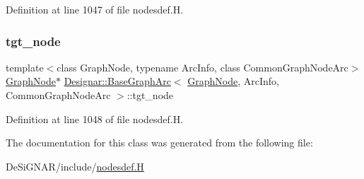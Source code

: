 Definition at line 1047 of file nodesdef.\+H.

\mbox{\label{class_designar_1_1_base_graph_arc_af09ee39743d9a2e6f7bad479d925c273}} 
\subsubsection{\texorpdfstring{tgt\+\_\+node}{tgt\_node}}
{\footnotesize\ttfamily template$<$class Graph\+Node, typename Arc\+Info, class Common\+Graph\+Node\+Arc$>$ \\
\hyperlink{class_designar_1_1_graph_node}{Graph\+Node}$\ast$ \hyperlink{class_designar_1_1_base_graph_arc}{Designar\+::\+Base\+Graph\+Arc}$<$ \hyperlink{class_designar_1_1_graph_node}{Graph\+Node}, Arc\+Info, Common\+Graph\+Node\+Arc $>$\+::tgt\+\_\+node\hspace{0.3cm}{\ttfamily [protected]}}



Definition at line 1048 of file nodesdef.\+H.



The documentation for this class was generated from the following file\+:\begin{DoxyCompactItemize}
\item 
De\+Si\+G\+N\+A\+R/include/\hyperlink{nodesdef_8_h}{nodesdef.\+H}\end{DoxyCompactItemize}
